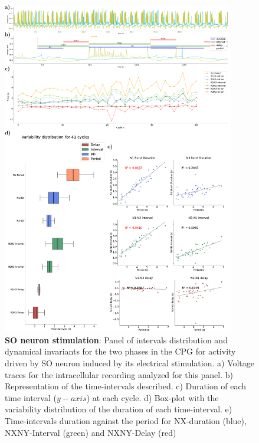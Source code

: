 \begin{figure}[htbp]
	\centering
	\includegraphics[width=0.9\textwidth]{./img/invariants/data/SUSSEX/SO_driven/images/panel_with_intervals.pdf}
	\caption{\textbf{SO neuron stimulation}: Panel of intervals distribution and dynamical invariants for the two phases in the CPG for activity driven by SO neuron induced by its electrical stimulation. a) Voltage traces for the intracellular recording analyzed for this panel. b) Representation of the time-intervals described. c) Duration of each time interval ($y-axis$) at each cycle. d) Box-plot with the variability distribution of the duration of each time-interval. e) Time-intervals duration against the period for NX-duration (blue), NXNY-Interval (green) and NXNY-Delay (red)}
	\label{fig:so induced invariants}
\end{figure}

